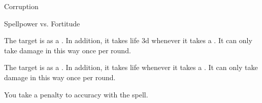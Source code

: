 \newpage
\begin{spellsection}{Corruption}

\begin{spellheader}
\end{spellheader}

\begin{spellcontent}

\begin{spelltargetinginfo}




\end{spelltargetinginfo}


\begin{spelleffects}




\begin{spellattack}{Spellpower vs. Fortitude}


\hit
The target is  as a .
In addition, it takes life  \minus3d whenever it takes a .
It can only take damage in this way once per round.



\crit
The target is  as a .
In addition, it takes life  whenever it takes a .
It can only take damage in this way once per round.



\end{spellattack}





\end{spelleffects}

\end{spellcontent}
\begin{spellfooter}


\end{spellfooter}
\begin{spellsubcontent}


\begin{spellcantrip}

You take a  penalty to accuracy with the spell.

\end{spellcantrip}


\end{spellsubcontent}
\end{spellsection}


